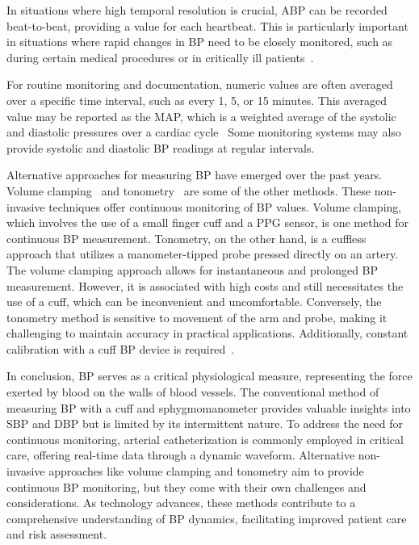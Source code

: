 In situations where high temporal resolution is crucial, ABP can be recorded beat-to-beat, providing a value for each heartbeat.
This is particularly important in situations where rapid changes in BP need to be closely monitored, such as during certain medical procedures or in critically ill patients~\cite{lehmanMethodsBloodPressure2013}.

For routine monitoring and documentation, numeric values are often averaged over a specific time interval, such as every 1, 5, or 15 minutes.
This averaged value may be reported as the \ac{MAP}, which is a weighted average of the systolic and diastolic pressures over a cardiac cycle~\cite{demersPhysiologyMeanArterial2024}
Some monitoring systems may also provide systolic and diastolic BP readings at regular intervals.

Alternative approaches for measuring BP have emerged over the past years.
Volume clamping~\cite{kimBallistocardiogramBasedApproachCuffless2018} and tonometry~\cite{imholzFifteenYearsExperience1998} are some of the other methods.
These non-invasive techniques offer continuous monitoring of BP values.
Volume clamping, which involves the use of a small finger cuff and a PPG sensor, is one method for continuous BP measurement.
Tonometry, on the other hand, is a cuffless approach that utilizes a manometer-tipped probe pressed directly on an artery.
The volume clamping approach allows for instantaneous and prolonged BP measurement.
However, it is associated with high costs and still necessitates the use of a cuff, which can be inconvenient and uncomfortable.
Conversely, the tonometry method is sensitive to movement of the arm and probe, making it challenging to maintain accuracy in practical applications.
Additionally, constant calibration with a cuff BP device is required~\cite{peterReviewMethodsNoninvasive2014}.

\vspace{0.2cm}

In conclusion, BP serves as a critical physiological measure, representing the force exerted by blood on the walls of blood vessels.
The conventional method of measuring BP with a cuff and sphygmomanometer provides valuable insights into SBP and DBP but is limited by its intermittent nature.
To address the need for continuous monitoring, arterial catheterization is commonly employed in critical care, offering real-time data through a dynamic waveform.
Alternative non-invasive approaches like volume clamping and tonometry aim to provide continuous BP monitoring, but they come with their own challenges and considerations.
As technology advances, these methods contribute to a comprehensive understanding of BP dynamics, facilitating improved patient care and risk assessment.

